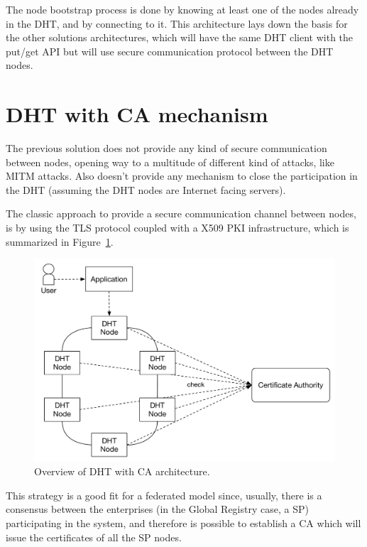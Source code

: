 The node bootstrap process is done by knowing at least one of the nodes already in the DHT, and by connecting to it.
This architecture lays down the basis for the other solutions architectures, which will have the same DHT client with the put/get API but will use secure communication protocol between the DHT nodes.

\section{DHT with \ac{CA} mechanism}\label{architecture:ca-overview}

The previous solution does not provide any kind of secure communication between nodes, opening way to a multitude of different kind of attacks, like \ac{MITM} attacks.
Also doesn't provide any mechanism to close the participation in the \ac{DHT} (assuming the DHT nodes are Internet facing servers).

The classic approach to provide a secure communication channel between nodes, is by using the \ac{TLS} protocol coupled with a X509 PKI infrastructure, which is summarized in Figure~\ref{fig:architecture-ca-overview}.

\begin{figure}
  \centering
  \includegraphics[scale=0.5]{Figures/architecture-overview-ca.pdf}
  \caption{Overview of DHT with CA architecture.}
\label{fig:architecture-ca-overview}
\end{figure}

This strategy is a good fit for a federated model since, usually, there is a consensus between the enterprises (in the Global Registry case, a \acl{SP}) participating in the system, and therefore is possible to establish a \ac{CA} which will issue the certificates of all the \ac{SP} nodes.

